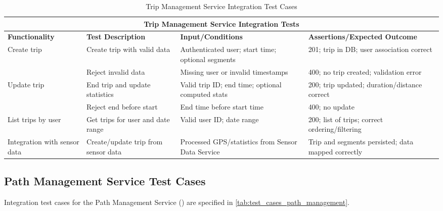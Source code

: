 \begin{table}[ht]
\centering
\begin{tabular}{|p{3.2cm}|p{3.8cm}|p{3.2cm}|p{4.8cm}|}
\hline
\multicolumn{4}{|c|}{\textbf{Trip Management Service Integration Tests}} \\ 
\hline
\textbf{Functionality} & \textbf{Test Description} & \textbf{Input/Conditions} & \textbf{Assertions/Expected Outcome} \\
\hline
\multirow{2}{*}{Create trip}
 & Create trip with valid data
 & Authenticated user; start time; optional segments
 & 201; trip in DB; user association correct \\ \cline{2-4}
 & Reject invalid data
 & Missing user or invalid timestamps
 & 400; no trip created; validation error \\
\hline
\multirow{2}{*}{Update trip}
 & End trip and update statistics
 & Valid trip ID; end time; optional computed stats
 & 200; trip updated; duration/distance correct \\ \cline{2-4}
 & Reject end before start
 & End time before start time
 & 400; no update \\
\hline
List trips by user
 & Get trips for user and date range
 & Valid user ID; date range
 & 200; list of trips; correct ordering/filtering \\
\hline
Integration with sensor data
 & Create/update trip from sensor data
 & Processed GPS/statistics from Sensor Data Service
 & Trip and segments persisted; data mapped correctly \\
\hline
\end{tabular}
\caption{Trip Management Service Integration Test Cases}
\label{tab:test_cases_trip_management}
\end{table}

\subsection{Path Management Service Test Cases}
\label{subsec:path_management_service_test_cases}%

Integration test cases for the Path Management Service () are specified in \cref{tab:test_cases_path_management}.

